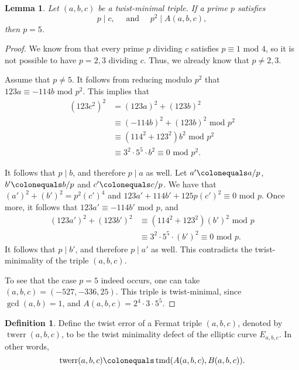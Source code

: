 \documentclass[12pt]{amsart}
\newcounter{counter}[section] %
\numberwithin{equation}{section} %
\newtheorem{lemma}[counter]{Lemma}
\theoremstyle{definition} \newtheorem{definition}[counter]{Definition}
\theoremstyle{remark} \newtheorem{nonexam}[counter]{Non-example}
\newcommand{\md}{\text{ mod }} %
\newcommand{\cdef}[1]{\textsf{#1}} %
\newcommand{\mand}{\text{ and }} %
\DeclareMathOperator{\twmind}{tmd} %
\DeclareMathOperator{\twerr}{twerr} %
\begin{document}
\begin{lemma}
  \label{lemma:p-mid-c-and-pp-mid-A}
  Let $(a,b,c)$ be a twist-minimal triple. If a prime $p$ satisfies
  \begin{equation*}
    p \mid c,\quad \mand \quad p^2 \mid A(a,b,c),
  \end{equation*}
  then $p=5$.
\end{lemma}
\begin{proof}
  We know from  that every prime $p$ dividing $c$
  satisfies $p \equiv 1 \md 4$, so it is not possible to have $p = 2,3$
  dividing $c$. Thus, we already know that $p \neq 2,3$.

  Assume that $p \neq 5$. It follows from reducing  modulo $p^2$
  that $123a \equiv -114b \md p^2$. This implies that
  \begin{align*}
    (123c^2)^2 &= (123a)^2 + (123b)^2 \\
               &\equiv (-114b)^2 + (123b)^2 \md p^2 \\
               &\equiv (114^2 + 123^2)b^2 \md p^2 \\
               &\equiv 3^2\cdot 5^5\cdot b^2 \equiv 0 \md p^2 .
  \end{align*}

It follows that $p \mid b$, and therefore $p \mid a$ as well. Let $a'
\colonequals a/p$, $b' \colonequals b/p$ and $c'\colonequals c/p$. We have that
$(a')^2 + (b')^2 = p^2(c')^4$ and $123a' + 114b' + 125p(c')^2 \equiv 0 \md p$.
Once more, it follows that $123a' \equiv -114b' \md p$, and
  \begin{align*}
    (123a')^2 + (123b')^2 &\equiv (114^2 + 123^2)(b')^2 \md p \\
                       &\equiv 3^2\cdot 5^5\cdot (b')^2 \equiv 0 \md p .
  \end{align*}
  It follows that $p \mid b'$, and therefore $p \mid a'$ as well. This
  contradicts the twist-minimality of the triple $(a,b,c)$.

  To see that the case $p=5$ indeed occurs, one can take $(a,b,c) = (-527,
  -336, 25)$. This triple is twist-minimal, since $\gcd(a,b)=1$, and $A(a,b,c)
  = 2^4\cdot 3 \cdot 5^5$.
\end{proof}

\begin{definition}
  Define the \cdef{twist error} of a Fermat triple $(a,b,c)$, denoted by $\twerr(a,b,c)$, to be the twist
  minimality defect of the elliptic curve $E_{a,b,c}$. In other words,
  \begin{equation*}
    \twerr(a,b,c) \colonequals \twmind(A(a,b,c),B(a,b,c)).
  \end{equation*}
\end{definition}
\end{document}
